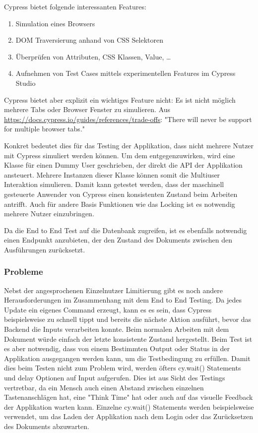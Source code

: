 Cypress bietet folgende interessanten Features:

\begin{enumerate}
    \item Simulation eines Browsers
    \item DOM Traversierung anhand von CSS Selektoren
    \item \"Uberpr\"ufen von Attributen, CSS Klassen, Value, \ldots
    \item Aufnehmen von Test Cases mittels experimentellen Features im Cypress Studio
\end{enumerate}

Cypress bietet aber explizit ein wichtiges Feature nicht: Es ist nicht m\"oglich mehrere Tabs oder Browser Fenster zu simulieren.
Aus \url{https://docs.cypress.io/guides/references/trade-offs}: "There will never be support for multiple browser tabs."

Konkret bedeutet dies f\"ur das Testing der Applikation, dass nicht mehrere Nutzer mit Cypress simuliert werden k\"onnen.
Um dem entgegenzuwirken, wird eine Klasse f\"ur einen Dummy User geschrieben, der direkt die API der Applikation ansteuert.
Mehrere Instanzen dieser Klasse k\"onnen somit die Multiuser Interaktion simulieren.
Damit kann getestet werden, dass der maschinell gesteuerte Anwender von Cypress einen konsistenten Zustand beim Arbeiten antrifft.
Auch f\"ur andere Basis Funktionen wie das Locking ist es notwendig mehrere Nutzer einzubringen.

Da die End to End Test auf die Datenbank zugreifen, ist es ebenfalls notwendig einen Endpunkt anzubieten, der den Zustand des Dokuments zwischen den Ausf\"uhrungen zur\"ucksetzt.

\subsubsection{Probleme}
Nebst der angesprochenen Einzelnutzer Limitierung gibt es noch andere Herausforderungen im Zusammenhang mit dem End to End Testing.
Da jedes Update ein eigenes Command erzeugt, kann es es sein, dass Cypress beispielsweise zu schnell tippt und bereits die n\"achste Aktion ausf\"uhrt, bevor das Backend die Inputs verarbeiten konnte.
Beim normalen Arbeiten mit dem Dokument w\"urde einfach der letzte konsistente Zustand hergestellt.
Beim Test ist es aber notwendig, dass von einem Bestimmten Output oder Status in der Applikation ausgegangen werden kann, um die Testbedingung zu erf\"ullen.
Damit dies beim Testen nicht zum Problem wird, werden \"ofters cy.wait() Statements und delay Optionen auf Input aufgerufen.
Dies ist aus Sicht des Testings vertretbar, da ein Mensch auch einen Abstand zwischen einzelnen Tastenanschl\"agen hat, eine "Think Time" hat oder auch auf das visuelle Feedback der Applikation warten kann.
Einzelne cy.wait() Statements werden beispielsweise verwendet, um das Laden der Applikation nach dem Login oder das Zur\"ucksetzen des Dokuments abzuwarten.

